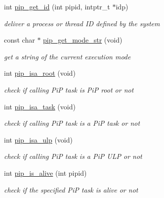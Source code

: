 \begin{DoxyCompactItemize}
\item 
int \hyperlink{group__libpip_ga8ed1ba448edbc0f2e0af78abdcc62b7c}{pip\-\_\-get\-\_\-id} (int pipid, intptr\-\_\-t $\ast$idp)
\begin{DoxyCompactList}\small\item\em deliver a process or thread I\-D defined by the system \end{DoxyCompactList}\end{DoxyCompactItemize}
\begin{DoxyCompactItemize}
\item 
const char $\ast$ \hyperlink{group__libpip_ga0e12c95fe7abc5c356acfd45a89ad5d8}{pip\-\_\-get\-\_\-mode\-\_\-str} (void)
\begin{DoxyCompactList}\small\item\em get a string of the current execution mode \end{DoxyCompactList}\end{DoxyCompactItemize}
\begin{DoxyCompactItemize}
\item 
int \hyperlink{group__libpip_ga6f1045bdbf682cb2ac504f09b57b73e9}{pip\-\_\-isa\-\_\-root} (void)
\begin{DoxyCompactList}\small\item\em check if calling Pi\-P task is Pi\-P root or not \end{DoxyCompactList}\end{DoxyCompactItemize}
\begin{DoxyCompactItemize}
\item 
int \hyperlink{group__libpip_gaf0283e47ad2d415206d6a3fa61e8a0a9}{pip\-\_\-isa\-\_\-task} (void)
\begin{DoxyCompactList}\small\item\em check if calling Pi\-P task is a Pi\-P task or not \end{DoxyCompactList}\end{DoxyCompactItemize}
\begin{DoxyCompactItemize}
\item 
int \hyperlink{group__libpip_gafc11d79f0f63c4c57ccb5c3bb2803241}{pip\-\_\-isa\-\_\-ulp} (void)
\begin{DoxyCompactList}\small\item\em check if calling Pi\-P task is a Pi\-P U\-L\-P or not \end{DoxyCompactList}\end{DoxyCompactItemize}
\begin{DoxyCompactItemize}
\item 
int \hyperlink{group__libpip_gacefb1f29e5f5d9b21309a1d041e78790}{pip\-\_\-is\-\_\-alive} (int pipid)
\begin{DoxyCompactList}\small\item\em check if the specified Pi\-P task is alive or not \end{DoxyCompactList}\end{DoxyCompactItemize}
